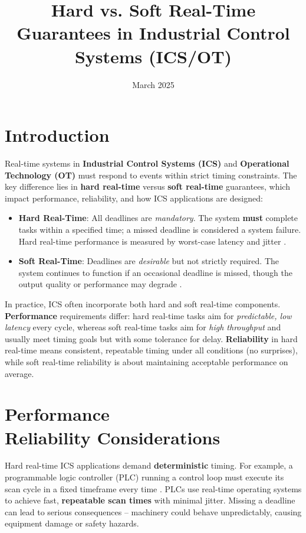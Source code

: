 \documentclass{article}
\title{Hard vs. Soft Real-Time Guarantees in Industrial Control Systems (ICS/OT)}
\author{}
\date{March 2025}
\begin{document}
\maketitle

\section{Introduction}
Real-time systems in \textbf{Industrial Control Systems (ICS)} and \textbf{Operational Technology (OT)} must respond to events within strict timing constraints. The key difference lies in \textbf{hard real-time} versus \textbf{soft real-time} guarantees, which impact performance, reliability, and how ICS applications are designed:

\begin{itemize}
    \item \textbf{Hard Real-Time}: All deadlines are \emph{mandatory}. The system \textbf{must} complete tasks within a specified time; a missed deadline is considered a system failure. Hard real-time performance is measured by worst-case latency and jitter \cite{intel_realtime}.
    \item \textbf{Soft Real-Time}: Deadlines are \emph{desirable} but not strictly required. The system continues to function if an occasional deadline is missed, though the output quality or performance may degrade \cite{intel_realtime}.
\end{itemize}

In practice, ICS often incorporate both hard and soft real-time components. \textbf{Performance} requirements differ: hard real-time tasks aim for \textit{predictable, low latency} every cycle, whereas soft real-time tasks aim for \textit{high throughput} and usually meet timing goals but with some tolerance for delay. \textbf{Reliability} in hard real-time means consistent, repeatable timing under all conditions (no surprises), while soft real-time reliability is about maintaining acceptable performance on average.

\section{Performance \\ Reliability Considerations}
Hard real-time ICS applications demand \textbf{deterministic} timing. For example, a programmable logic controller (PLC) running a control loop must execute its scan cycle in a fixed timeframe every time \cite{plc_whitepaper}. PLCs use real-time operating systems to achieve fast, \textbf{repeatable scan times} with minimal jitter. Missing a deadline can lead to serious consequences – machinery could behave unpredictably, causing equipment damage or safety hazards.
\end{document}
